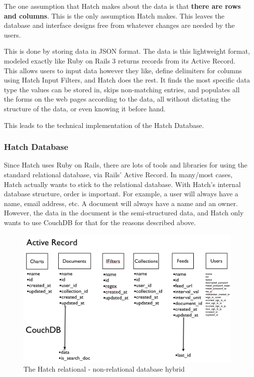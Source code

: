 The one assumption that Hatch makes about the data is that \textbf{there are rows and
columns}. This is the only assumption Hatch makes. This leaves the database and 
interface designs free from whatever changes are needed by the users.

This is done by storing data in JSON format. The data is this lightweight format,
modeled exactly like Ruby on Rails 3 returns records from its Active Record.
This allows users to input data however they like, define delimiters for columns using
Hatch Input Filters, and Hatch does the rest. It finds the most specific data type the
values can be stored in, skips non-matching entries, and populates all the forms on 
the web pages according to the data, all without dictating the structure of the 
data, or even knowing it before hand.

This leads to the technical implementation of the Hatch Database.


\subsubsection{Hatch Database}
Since Hatch uses Ruby on Rails, there are lots of tools and libraries for using the 
standard relational database, via Rails' Active Record. In many/most cases, Hatch
actually wants to stick to the relational database. With Hatch's internal database
structure, order is important. For example, a user will always have a name, email
address, etc. A document will always have a name and an owner. However, the data in the
document is the semi-structured data, and Hatch only wants to use CouchDB for that for
the reasons described above.

\begin{figure}[h]
	\begin{center}
	\includegraphics[width=120mm]{images/hatch_db_hybrid}
	\caption{The Hatch relational - non-relational database hybrid} 
	\label{hatch_db_hybrid}
	\end{center}
\end{figure}

